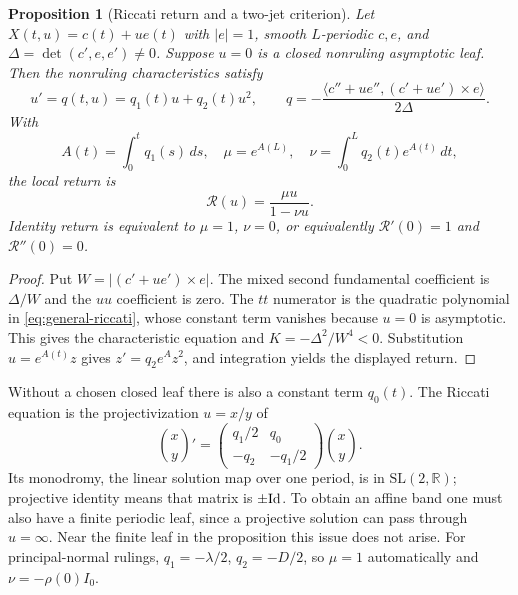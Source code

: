 \documentclass[11pt]{amsart}
\newtheorem{proposition}[theorem]{Proposition}
\theoremstyle{definition}
\theoremstyle{remark}
\newcommand{\R}{\mathbb R}\newcommand{\Sph}{\mathbb S}
\numberwithin{equation}{section}
\begin{document}
\begin{proposition}[Riccati return and a two-jet criterion]
\label{prop:general-ruled-return}
Let $X(t,u)=c(t)+ue(t)$ with $|e|=1$, smooth $L$-periodic $c,e$, and
$\Delta=\det(c',e,e')\ne0$. Suppose $u=0$ is a closed nonruling
asymptotic leaf. Then the nonruling characteristics satisfy
\begin{equation}\label{eq:general-riccati}
 u'=q(t,u)=q_1(t)u+q_2(t)u^2,
 \qquad q=-\frac{\langle c''+ue'',(c'+ue')\times e\rangle}{2\Delta}.
\end{equation}
With
\[
 A(t)=\int_0^tq_1(s)\,ds,\quad \mu=e^{A(L)},\quad
 \nu=\int_0^Lq_2(t)e^{A(t)}\,dt,
\]
the local return is
\begin{equation}\label{eq:general-return}
 \mathcal R(u)=\frac{\mu u}{1-\nu u}.
\end{equation}
Identity return is equivalent to $\mu=1$, $\nu=0$, or equivalently
$\mathcal R'(0)=1$ and $\mathcal R''(0)=0$.
\end{proposition}
\begin{proof}
Put $W=|(c'+ue')\times e|$. The mixed second fundamental coefficient
is $\Delta/W$ and the $uu$ coefficient is zero. The $tt$ numerator
is the quadratic polynomial in \eqref{eq:general-riccati}, whose constant
term vanishes because $u=0$ is asymptotic. This gives the characteristic
equation and $K=-\Delta^2/W^4<0$. Substitution $u=e^{A(t)}z$ gives
$z'=q_2e^Az^2$, and integration yields the displayed return.
\end{proof}
Without a chosen closed leaf there is also a constant term $q_0(t)$.
The Riccati equation is the projectivization $u=x/y$ of
\[
 \binom{x}{y}'=
 \begin{pmatrix}q_1/2&q_0\\-q_2&-q_1/2\end{pmatrix}\binom{x}{y}.
\]
Its monodromy, the linear solution map over one period, is in
$\mathrm{SL}(2,\R)$; projective identity means that
matrix is $\pm\mathrm{Id}$. To obtain an affine band one must also have a finite
periodic leaf, since a projective solution can pass through $u=\infty$.
Near the finite leaf in the proposition this issue does not arise.
For principal-normal rulings, $q_1=-\lambda/2$, $q_2=-D/2$, so
$\mu=1$ automatically and $\nu=-\rho(0)I_0$.
\end{document}
